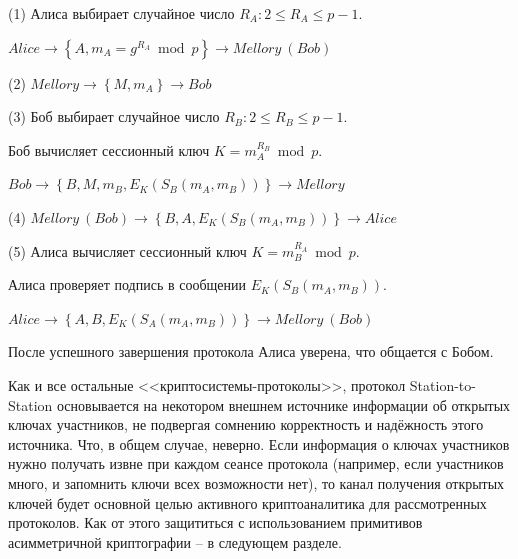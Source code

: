 \begin{protocol}
    \item[(1)] Алиса выбирает случайное число $R_A: 2 \leq R_A \leq p-1$.
    \item[{}] $Alice \to \left\{ A, m_A = g^{R_A} \bmod p \right\} \to Mellory~(Bob)$

    \item[(2)] $Mellory \to \left\{ M, m_A \right\} \to Bob$

    \item[(3)] Боб выбирает случайное число $R_B: 2 \leq R_B \leq p-1$.
    \item[{}] Боб вычисляет сессионный ключ $K = m_A^{R_B} \bmod p$.
    \item[{}] $Bob \to \left\{ B, M, m_B, E_K( S_B ( m_A, m_B )) \right\} \to Mellory$

    \item[(4)] $Mellory~(Bob) \to \left\{ B, A, E_K( S_B ( m_A, m_B )) \right\} \to Alice$

    \item[(5)] Алиса вычисляет сессионный ключ $K = m_B^{R_A} \bmod p$.
    \item[{}] Алиса проверяет подпись в сообщении $E_K( S_B ( m_A, m_B ))$.
    \item[{}] $Alice \to \left\{ A, B, E_K( S_A ( m_A, m_B ) ) \right\} \to Mellory~(Bob)$
\end{protocol}

После успешного завершения протокола Алиса уверена, что общается с Бобом.

Как и все остальные <<криптосистемы-протоколы>>, протокол Station-to-Station основывается на некотором внешнем источнике информации об открытых ключах участников, не подвергая сомнению корректность и надёжность этого источника. Что, в общем случае, неверно. Если информация о ключах участников нужно получать извне при каждом сеансе протокола (например, если участников много, и запомнить ключи всех возможности нет), то канал получения открытых ключей будет основной целью активного криптоаналитика для рассмотренных протоколов. Как от этого защититься с использованием примитивов асимметричной криптографии -- в следующем разделе.

